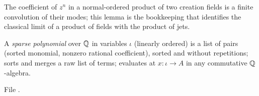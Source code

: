 \begin{physics}
The coefficient of $z^n$ in a normal-ordered product of two creation fields is a finite convolution of their modes;
this lemma is the bookkeeping that identifies the classical limit of a product of fields with the product of jets.
\end{physics}

\begin{definition}\label{l11:def:sparse}
A \emph{sparse polynomial} over ${\mathbb{Q}}$ in variables $\iota$ (linearly ordered) is a list of pairs (sorted monomial,
nonzero rational coefficient), sorted and without repetitions;  sorts and merges a raw list of
terms;  evaluates at $x:\iota\to A$ in any commutative ${\mathbb{Q}}$-algebra.
\end{definition}
\noindent File .
